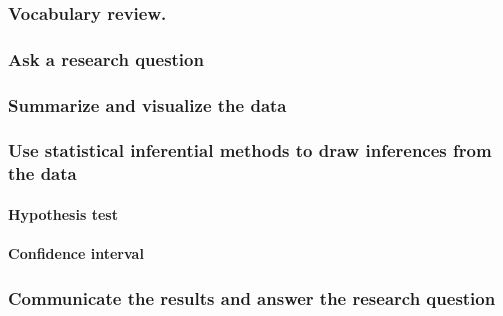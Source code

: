 \documentclass[
]{report}
\begin{document}
\hypertarget{vocabulary-review.}{%
\subsubsection*{Vocabulary review.}\label{vocabulary-review.}}

\hypertarget{ask-a-research-question-3}{%
\subsubsection*{Ask a research question}\label{ask-a-research-question-3}}

\hypertarget{summarize-and-visualize-the-data-3}{%
\subsubsection*{Summarize and visualize the data}\label{summarize-and-visualize-the-data-3}}

\hypertarget{use-statistical-inferential-methods-to-draw-inferences-from-the-data-1}{%
\subsubsection*{Use statistical inferential methods to draw inferences from the data}\label{use-statistical-inferential-methods-to-draw-inferences-from-the-data-1}}

\hypertarget{hypothesis-test}{%
\paragraph*{Hypothesis test}\label{hypothesis-test}}

\hypertarget{confidence-interval-5}{%
\paragraph*{Confidence interval}\label{confidence-interval-5}}

\hypertarget{communicate-the-results-and-answer-the-research-question-2}{%
\subsubsection*{Communicate the results and answer the research question}\label{communicate-the-results-and-answer-the-research-question-2}}
\end{document}
